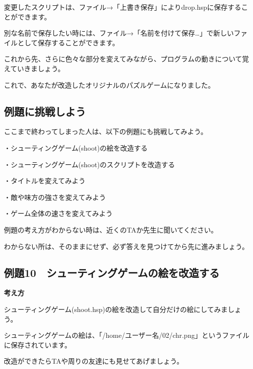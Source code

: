 \documentclass[a4paper,12pt]{jarticle}
\begin{document}
\bigskip
\bigskip
\bigskip

変更したスクリプトは、ファイル→「上書き保存」によりdrop.hspに保存することができます。

別な名前で保存したい時には、ファイル→「名前を付けて保存…」で新しいファイルとして保存することができます。

これから先、さらに色々な部分を変えてみながら、プログラムの動きについて覚えていきましょう。


\bigskip

これで、あなたが改造したオリジナルのパズルゲームになりました。

\bigskip



\subsection{例題に挑戦しよう}

\bigskip
\bigskip

ここまで終わってしまった人は、以下の例題にも挑戦してみよう。


\bigskip

・シューティングゲーム(shoot)の絵を改造する

・シューティングゲーム(shoot)のスクリプトを改造する

・タイトルを変えてみよう

・敵や味方の強さを変えてみよう

・ゲーム全体の速さを変えてみよう

\bigskip

例題の考え方がわからない時は、近くのTAか先生に聞いてください。

わからない所は、そのままにせず、必ず答えを見つけてから先に進みましょう。

\bigskip


\clearpage
\subsection{例題10　シューティングゲームの絵を改造する}
\bigskip
\bigskip

{\bfseries
考え方}

\bigskip

シューティングゲーム(shoot.hsp)の絵を改造して自分だけの絵にしてみましょう。

シューティングゲームの絵は、「/home/ユーザー名/02/chr.png」というファイルに保存されています。

改造ができたらTAや周りの友達にも見せてあげましょう。
\end{document}
